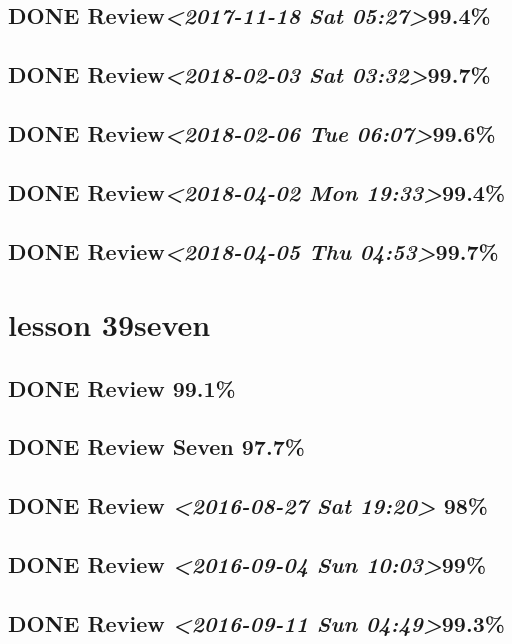 \documentclass[11pt]{ctexart}
\begin{document}
\subsection{{\bfseries\sffamily DONE} Review\textit{<2017-11-18 Sat 05:27>}99.4\%}
\label{sec:orgece2adc}
\subsection{{\bfseries\sffamily DONE} Review\textit{<2018-02-03 Sat 03:32>}99.7\%}
\label{sec:orgbc4c80b}
\subsection{{\bfseries\sffamily DONE} Review\textit{<2018-02-06 Tue 06:07>}99.6\%}
\label{sec:orgba1bfd8}
\subsection{{\bfseries\sffamily DONE} Review\textit{<2018-04-02 Mon 19:33>}99.4\%}
\label{sec:orgb5ce6d9}
\subsection{{\bfseries\sffamily DONE} Review\textit{<2018-04-05 Thu 04:53>}99.7\%}
\label{sec:org912b39e}
\section{lesson 39seven}
\label{sec:org967632a}
\subsection{{\bfseries\sffamily DONE} Review 99.1\%}
\label{sec:orgd80d0de}

\subsection{{\bfseries\sffamily DONE} Review Seven 97.7\%}
\label{sec:org454e77f}
\subsection{{\bfseries\sffamily DONE} Review \textit{<2016-08-27 Sat 19:20> } 98\%}
\label{sec:org7e71329}
\subsection{{\bfseries\sffamily DONE} Review \textit{<2016-09-04 Sun 10:03>}99\%}
\label{sec:orga233ec5}
\subsection{{\bfseries\sffamily DONE} Review \textit{<2016-09-11 Sun 04:49>}99.3\%}
\label{sec:org11b61be}
\end{document}
